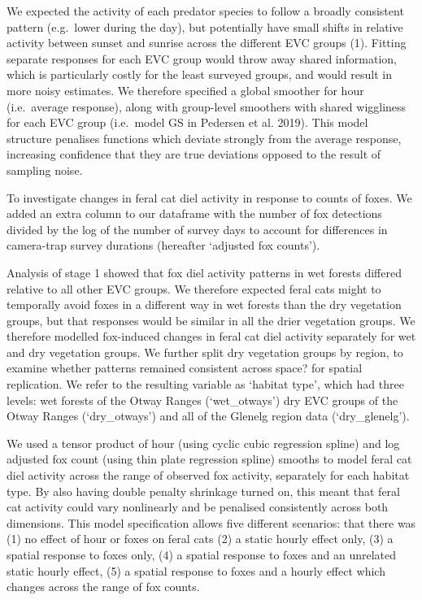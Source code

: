\documentclass[]{elsarticle} %
\begin{document}
We expected the activity of each predator species to follow a broadly consistent pattern (e.g.~lower during the day), but potentially have small shifts in relative activity between sunset and sunrise across the different EVC groups (1). Fitting separate responses for each EVC group would throw away shared information, which is particularly costly for the least surveyed groups, and would result in more noisy estimates. We therefore specified a global smoother for hour (i.e.~average response), along with group-level smoothers with shared wiggliness for each EVC group (i.e.~model GS in Pedersen et al. 2019). This model structure penalises functions which deviate strongly from the average response, increasing confidence that they are true deviations opposed to the result of sampling noise.

To investigate changes in feral cat diel activity in response to counts of foxes. We added an extra column to our dataframe with the number of fox detections divided by the log of the number of survey days to account for differences in camera-trap survey durations (hereafter `adjusted fox counts').

Analysis of stage 1 showed that fox diel activity patterns in wet forests differed relative to all other EVC groups. We therefore expected feral cats might to temporally avoid foxes in a different way in wet forests than the dry vegetation groups, but that responses would be similar in all the drier vegetation groups. We therefore modelled fox-induced changes in feral cat diel activity separately for wet and dry vegetation groups. We further split dry vegetation groups by region, to examine whether patterns remained consistent across space? for spatial replication. We refer to the resulting variable as `habitat type', which had three levels: wet forests of the Otway Ranges (`wet\_otways') dry EVC groups of the Otway Ranges (`dry\_otways') and all of the Glenelg region data (`dry\_glenelg').

We used a tensor product of hour (using cyclic cubic regression spline) and log adjusted fox count (using thin plate regression spline) smooths to model feral cat diel activity across the range of observed fox activity, separately for each habitat type. By also having double penalty shrinkage turned on, this meant that feral cat activity could vary nonlinearly and be penalised consistently across both dimensions. This model specification allows five different scenarios: that there was (1) no effect of hour or foxes on feral cats (2) a static hourly effect only, (3) a spatial response to foxes only, (4) a spatial response to foxes and an unrelated static hourly effect, (5) a spatial response to foxes and a hourly effect which changes across the range of fox counts.
\end{document}
